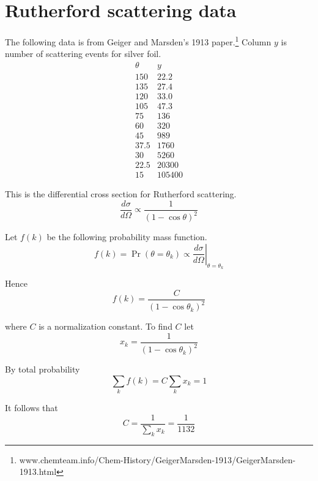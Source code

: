 

\section*{Rutherford scattering data}

The following data is from Geiger and Marsden's 1913 paper.\footnote{www.chemteam.info/Chem-History/GeigerMarsden-1913/GeigerMarsden-1913.html}
Column $y$ is number of scattering events for silver foil.
\begin{equation*}
\begin{matrix}
\theta & y\\
150 & 22.2\\
135 & 27.4\\
120 & 33.0\\
105 & 47.3\\
75 & 136\\
60 & 320\\
45 & 989\\
37.5 & 1760\\
30 & 5260\\
22.5 & 20300\\
15 & 105400
\end{matrix}
\end{equation*}

This is the differential cross section for Rutherford scattering.
\begin{equation*}
\frac{d\sigma}{d\Omega}\propto
\frac{1}{(1-\cos\theta)^2}
\end{equation*}

Let $f(k)$ be the following probability mass function.
\begin{equation*}
f(k)=\Pr(\theta=\theta_k)\propto\left.\frac{d\sigma}{d\Omega}\right|_{\theta=\theta_k}
\end{equation*}

Hence
\begin{equation*}
f(k)=\frac{C}{(1-\cos\theta_k)^2}
\end{equation*}

where $C$ is a normalization constant.
To find $C$ let
\begin{equation*}
x_k=\frac{1}{(1-\cos\theta_k)^2}
\end{equation*}

By total probability
\begin{equation*}
\sum_k f(k)=C\sum_k x_k=1
\end{equation*}

It follows that
\begin{equation*}
C=\frac{1}{\sum_k x_k}=\frac{1}{1132}
\end{equation*}

